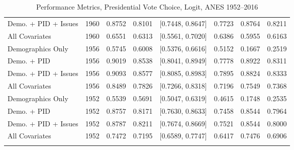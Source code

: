 \begin{longtable}{lrrrlrrr}
  Demo. + PID + Issues & 1960 & 0.8752 & 0.8101 & [0.7448, 0.8647] & 0.7723 & 0.8764 & 0.8211 \\ 
  All Covariates & 1960 & 0.6551 & 0.6313 & [0.5561, 0.7020] & 0.6386 & 0.5955 & 0.6163 \\ 
  Demographics Only & 1956 & 0.5745 & 0.6008 & [0.5376, 0.6616] & 0.5152 & 0.1667 & 0.2519 \\ 
  Demo. + PID & 1956 & 0.9019 & 0.8538 & [0.8041, 0.8949] & 0.7778 & 0.8922 & 0.8311 \\ 
  Demo. + PID + Issues & 1956 & 0.9093 & 0.8577 & [0.8085, 0.8983] & 0.7895 & 0.8824 & 0.8333 \\ 
  All Covariates & 1956 & 0.8489 & 0.7826 & [0.7266, 0.8318] & 0.7196 & 0.7549 & 0.7368 \\ 
  Demographics Only & 1952 & 0.5539 & 0.5691 & [0.5047, 0.6319] & 0.4615 & 0.1748 & 0.2535 \\ 
  Demo. + PID & 1952 & 0.8757 & 0.8171 & [0.7630, 0.8633] & 0.7458 & 0.8544 & 0.7964 \\ 
  Demo. + PID + Issues & 1952 & 0.8787 & 0.8211 & [0.7674, 0.8669] & 0.7521 & 0.8544 & 0.8000 \\ 
  All Covariates & 1952 & 0.7472 & 0.7195 & [0.6589, 0.7747] & 0.6417 & 0.7476 & 0.6906 \\ 
   \bottomrule
\caption{Performance Metrics, Presidential Vote Choice, Logit, ANES 1952--2016} 
\label{tab:ANES_prezvote_logit}
\end{longtable}
